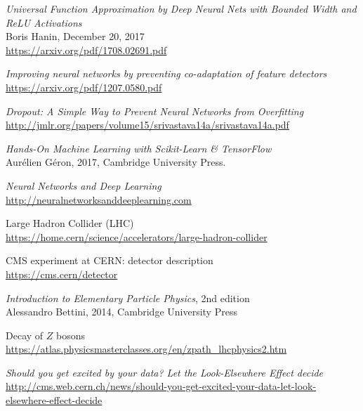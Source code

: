 \begin{thebibliography}{99}
    \textit{Universal Function Approximation by Deep Neural Nets with Bounded Width and ReLU Activations}
    \\Boris Hanin, December 20, 2017
    \\\url{https://arxiv.org/pdf/1708.02691.pdf}

    \textit{Improving neural networks by preventing co-adaptation of feature detectors}
    \\\url{https://arxiv.org/pdf/1207.0580.pdf}

    \textit{Dropout: A Simple Way to Prevent Neural Networks from Overfitting}
    \\\url{http://jmlr.org/papers/volume15/srivastava14a/srivastava14a.pdf}

    \textit{Hands-On Machine Learning with Scikit-Learn \& TensorFlow}
    \\Aurélien Géron, 2017, Cambridge University Press.

    \textit{Neural Networks and Deep Learning}
    \\\url{http://neuralnetworksanddeeplearning.com}

    Large Hadron Collider (LHC)
    \\\url{https://home.cern/science/accelerators/large-hadron-collider}

    CMS experiment at \textsc{CERN}: detector description
    \\\url{https://cms.cern/detector}

    \textit{Introduction to Elementary Particle Physics}, 2nd edition
    \\Alessandro Bettini, 2014, Cambridge University Press

    Decay of $Z$ bosons
    \\\url{https://atlas.physicsmasterclasses.org/en/zpath_lhcphysics2.htm}

    \textit{Should you get excited by your data? Let the Look-Elsewhere Effect decide}
    \\\url{http://cms.web.cern.ch/news/should-you-get-excited-your-data-let-look-elsewhere-effect-decide}
    
\end{thebibliography}

